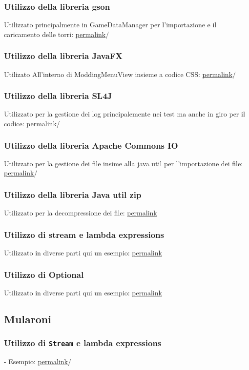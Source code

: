 \documentclass[a4paper,12pt]{report}
\begin{document}
\subsubsection{Utilizzo della libreria gson}
Utilizzato principalmente in GameDataManager per l'importazione e il caricamento delle torri: \href{https://google.com}{permalink}/ 
\subsubsection{Utilizzo della libreria JavaFX}
Utilizato All'interno di ModdingMenuView insieme a codice CSS: \href{https://google.com}{permalink}/ 
\subsubsection{Utilizzo della libreria SL4J}
Utilizzato per la gestione dei log principalemente nei test ma anche in giro per il codice: \href{https://google.com}{permalink}/ 
\subsubsection{Utilizzo della libreria Apache Commons IO}
Utilizzato per la gestione dei file insime alla java util per l'importazione dei file: \href{https://google.com}{permalink}/ 
\subsubsection{Utilizzo della libreria Java util zip}
Utilizzato per la decompressione dei file: \href{https://google.com}{permalink} 
\subsubsection{Utilizzo di stream e lambda expressions}
Utilizzato in diverse parti qui un esempio: \href{https://google.com}{permalink} 
\subsubsection{Utilizzo di Optional}
Utilizzato in diverse parti qui un esempio: \href{https://google.com}{permalink} 

\subsection{Mularoni}
\subsubsection{Utilizzo di \texttt{Stream} e lambda expressions} - Esempio: \href{https://google.com}{permalink}/ 
\end{document}
